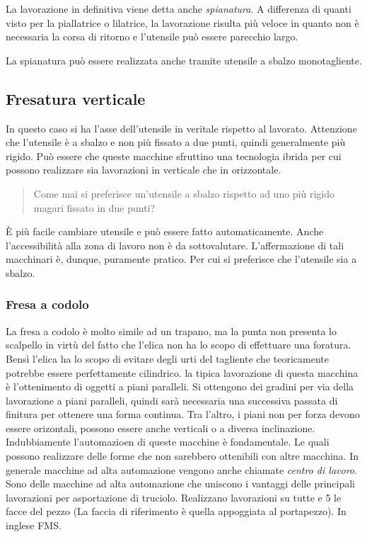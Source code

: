 La lavorazione in definitiva viene detta anche \emph{spianatura}. 
A differenza di quanti visto per la piallatrice o lilatrice, la lavorazione risulta più veloce in quanto
non è necessaria la corsa di ritorno e l'utensile può essere parecchio largo.

La spianatura può essere realizzata anche tramite utensile a sbalzo monotagliente.

\subsection{Fresatura verticale}
In questo caso si ha l'asse dell'utensile in veritale rispetto al lavorato. 
Attenzione che l'utensile è a sbalzo e non più fissato a due punti, quindi generalmente più rigido.
Può essere che queste macchine sfruttino una tecnologia ibrida per cui possono realizzare sia lavorazioni
in verticale che in orizzontale.

\begin{quote}
Come mai si preferisce un'utensile a sbalzo rispetto ad uno più rigido magari fissato in due punti?
\end{quote}

È più facile cambiare utensile e può essere fatto automaticamente. Anche l'accessibilità alla zona di lavoro
non è da sottovalutare.
L'affermazione di tali macchinari è, dunque, puramente pratico.
Per cui si preferisce che l'utensile sia a sbalzo.

\subsubsection{Fresa a codolo}
La fresa a codolo è molto simile ad un trapano, ma la punta non presenta lo scalpello in virtù del fatto che
l'elica non ha lo scopo di effettuare una foratura. Bensì l'elica ha lo scopo di evitare degli urti
del tagliente che teoricamente potrebbe essere perfettamente cilindrico.
la tipica lavorazione di questa macchina è l'ottenimento di oggetti a piani paralleli.
Si ottengono dei gradini per via della lavorazione a piani paralleli, quindi sarà necessaria una successiva 
passata di finitura per ottenere una forma continua.
Tra l'altro, i piani non per forza devono essere orizontali, possono essere anche verticali o a diversa 
inclinazione.
Indubbiamente l'automazioen di queste macchine è fondamentale. Le quali possono realizzare delle forme che
non sarebbero ottenibili con altre macchina.
In generale macchine ad alta automazione vengono anche chiamate \emph{centro di lavoro}.
Sono delle macchine ad alta automazione che uniscono i vantaggi delle principali lavorazioni per asportazione
di truciolo.
Realizzano lavorazioni su tutte e 5 le facce del pezzo (La faccia di riferimento è quella appoggiata al 
portapezzo). In inglese \ac{FMS}.

